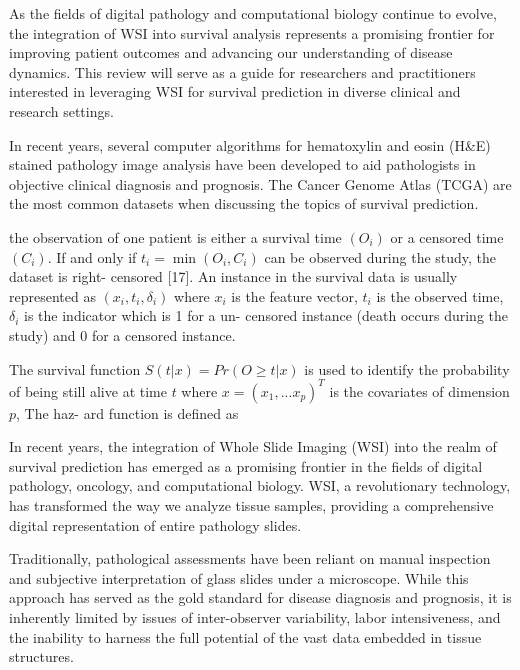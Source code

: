 \documentclass[journal,twoside,web]{ieeecolor}
\begin{document}
As the fields of digital pathology and computational biology continue to evolve, the integration of WSI into survival analysis represents a promising frontier for improving patient outcomes and advancing our understanding of disease dynamics. This review will serve as a guide for researchers and practitioners interested in leveraging WSI for survival prediction in diverse clinical and research settings.

In recent years, several computer algorithms for hematoxylin and eosin (H\&E) stained pathology image analysis have been developed to aid pathologists in objective clinical diagnosis and prognosis.
The Cancer Genome Atlas (TCGA) are the most common datasets when discussing the topics of survival prediction.

the observation of one patient is either a survival time $(O_i)$ or a censored time $(C_i).$ If and only if $t_i=\min(O_i,C_i)$ can be observed during the study, the dataset is right- censored [17]. An instance in the survival data is usually represented as $(x_i,t_i,\delta_i)$ where $x_i$ is the feature vector, $t_i$ is the observed time, $\delta_i$ is the indicator which is 1 for a un- censored instance (death occurs during the study) and 0 for a censored instance.

The survival function $S(t|x)=Pr(O\geq t|x)$ is used to identify the probability of being still alive at time $t$ where $x=(x_1,...x_p)^T$ is the covariates of dimension $p$, The haz- ard function is defined as

In recent years, the integration of Whole Slide Imaging (WSI) into the realm of survival prediction has emerged as a promising frontier in the fields of digital pathology, oncology, and computational biology. WSI, a revolutionary technology, has transformed the way we analyze tissue samples, providing a comprehensive digital representation of entire pathology slides.

Traditionally, pathological assessments have been reliant on manual inspection and subjective interpretation of glass slides under a microscope. While this approach has served as the gold standard for disease diagnosis and prognosis, it is inherently limited by issues of inter-observer variability, labor intensiveness, and the inability to harness the full potential of the vast data embedded in tissue structures.
\end{document}
